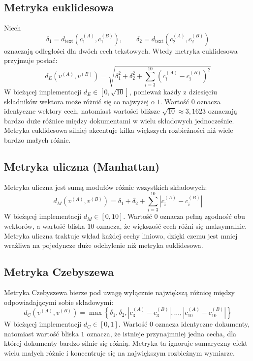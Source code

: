 \documentclass{article}
\begin{document}
\subsection{Metryka euklidesowa}
Niech
\begin{equation}
    \delta_1 = d_{\text{text}}(c_1^{(A)}, c_1^{(B)}), \qquad
    \delta_2 = d_{\text{text}}(c_2^{(A)}, c_2^{(B)})
\end{equation}
oznaczają odległości dla dwóch cech tekstowych. Wtedy metryka euklidesowa przyjmuje postać:
\begin{equation}
    d_E(v^{(A)}, v^{(B)}) =
    \sqrt{\delta_1^2 + \delta_2^2 + \sum_{i=3}^{10} \left(c_i^{(A)} - c_i^{(B)}\right)^2}
\end{equation}
W bieżącej implementacji $d_E \in [0,\sqrt{10}]$, ponieważ każdy z dziesięciu składników
wektora może różnić się co najwyżej o $1$. Wartość $0$ oznacza identyczne wektory cech,
natomiast wartości bliższe $\sqrt{10} \approx 3{,}1623$ oznaczają bardzo duże różnice między
dokumentami w wielu składowych jednocześnie. Metryka euklidesowa silniej akcentuje kilka
większych rozbieżności niż wiele bardzo małych różnic.

\subsection{Metryka uliczna (Manhattan)}
Metryka uliczna jest sumą modułów różnic wszystkich składowych:
\begin{equation}
    d_M(v^{(A)}, v^{(B)}) =
    \delta_1 + \delta_2 + \sum_{i=3}^{10} \left|c_i^{(A)} - c_i^{(B)}\right|
\end{equation}
W bieżącej implementacji $d_M \in [0,10]$. Wartość $0$ oznacza pełną zgodność obu wektorów,
a wartość bliska $10$ oznacza, że większość cech różni się maksymalnie. Metryka uliczna
traktuje wkład każdej cechy liniowo, dzięki czemu jest mniej wrażliwa na pojedyncze duże
odchylenie niż metryka euklidesowa.

\subsection{Metryka Czebyszewa}
Metryka Czebyszewa bierze pod uwagę wyłącznie największą różnicę między odpowiadającymi sobie
składowymi:
\begin{equation}
    d_C(v^{(A)}, v^{(B)}) = \max
    \left\{
        \delta_1, \delta_2,
        \left|c_3^{(A)} - c_3^{(B)}\right|,
        \ldots,
        \left|c_{10}^{(A)} - c_{10}^{(B)}\right|
    \right\}
\end{equation}
W bieżącej implementacji $d_C \in [0,1]$. Wartość $0$ oznacza identyczne dokumenty, natomiast
wartość bliska $1$ oznacza, że istnieje przynajmniej jedna cecha, dla której dokumenty bardzo
silnie się różnią. Metryka ta ignoruje sumaryczny efekt wielu małych różnic i koncentruje się
na największym rozbieżnym wymiarze.
\end{document}
